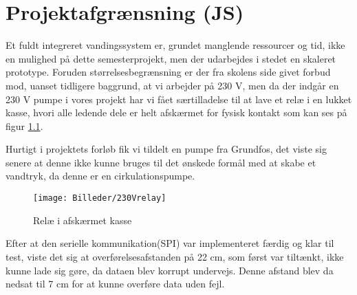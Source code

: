 \chapter{Projektafgrænsning (JS)}

Et fuldt integreret vandingssystem er, grundet manglende ressourcer og tid, ikke en mulighed på dette semesterprojekt, men der udarbejdes i stedet en skaleret prototype.
Foruden størrelsesbegrænsning er der fra skolens side givet forbud mod, uanset tidligere baggrund, at vi arbejder på 230 V, men da der indgår en 230 V pumpe i vores projekt har vi fået særtilladelse til at lave et relæ i en lukket kasse, hvori alle ledende dele er helt afskærmet for fysisk kontakt som kan ses på figur \ref{lab:230Vrelay}.

Hurtigt i projektets forløb fik vi tildelt en pumpe fra Grundfos, det viste sig senere at denne ikke kunne bruges til det ønskede formål med at skabe et vandtryk, da denne er en cirkulationspumpe. 


\begin{figure}[H]
  \centering
    \texttt{[image: Billeder/230Vrelay]}
    \caption{Relæ i afskærmet kasse}
    \label{lab:230Vrelay}
\end{figure}

Efter at den serielle kommunikation(SPI) var implementeret færdig og klar til test, viste det sig at overførelsesafstanden på 22 cm, som først var tiltænkt, ikke kunne lade sig gøre, da dataen blev korrupt undervejs. Denne afstand blev da nedsat til 7 cm for at kunne overføre data uden fejl.
 


